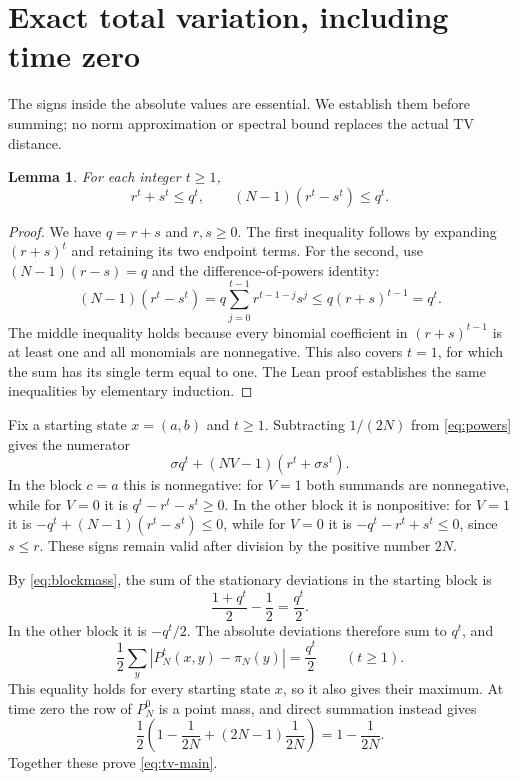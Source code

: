 \documentclass[11pt,a4paper]{article}
\newtheorem{lemma}[theorem]{Lemma}
\theoremstyle{definition}
\theoremstyle{remark}
\begin{document}
\section{Exact total variation, including time zero}

The signs inside the absolute values are essential. We establish them
before summing; no norm approximation or spectral bound replaces the
actual TV distance.

\begin{lemma}\label{lem:sign-estimates}
For each integer $t\ge1$,
\[
r^t+s^t\le q^t,\qquad (N-1)(r^t-s^t)\le q^t.
\]
\end{lemma}
\begin{proof}
We have $q=r+s$ and $r,s\ge0$. The first inequality follows by expanding
$(r+s)^t$ and retaining its two endpoint terms. For the second, use
$(N-1)(r-s)=q$ and the difference-of-powers identity:
\[
(N-1)(r^t-s^t)
=q\sum_{j=0}^{t-1}r^{t-1-j}s^j
\le q(r+s)^{t-1}=q^t.
\]
The middle inequality holds because every binomial coefficient in
$(r+s)^{t-1}$ is at least one and all monomials are nonnegative. This also
covers $t=1$, for which the sum has its single term equal to one. The Lean
proof establishes the same inequalities by elementary induction.
\end{proof}

Fix a starting state $x=(a,b)$ and $t\ge1$. Subtracting $1/(2N)$ from
\eqref{eq:powers} gives the numerator
\[
\sigma q^t+(NV-1)(r^t+\sigma s^t).
\]
In the block $c=a$ this is nonnegative: for $V=1$ both summands are
nonnegative, while for $V=0$ it is $q^t-r^t-s^t\ge0$.
In the other block it is nonpositive: for $V=1$ it is
$-q^t+(N-1)(r^t-s^t)\le0$, while for $V=0$ it is
$-q^t-r^t+s^t\le0$, since $s\le r$.
These signs remain valid after division by the positive number $2N$.

By \eqref{eq:blockmass}, the sum of the stationary deviations in the
starting block is
\[
\frac{1+q^t}{2}-\frac12=\frac{q^t}{2}.
\]
In the other block it is $-q^t/2$. The absolute deviations therefore sum
to $q^t$, and
\begin{equation}\label{eq:tv-positive}
\frac12\sum_y\left|P_N^t(x,y)-\pi_N(y)\right|=\frac{q^t}{2}
\qquad(t\ge1).
\end{equation}
This equality holds for every starting state $x$, so it also gives their
maximum. At time zero the row of $P_N^0$ is a point mass, and direct summation
instead gives
\[
\frac12\left(1-\frac1{2N}+(2N-1)\frac1{2N}\right)
=1-\frac1{2N}.
\]
Together these prove \eqref{eq:tv-main}.
\end{document}
